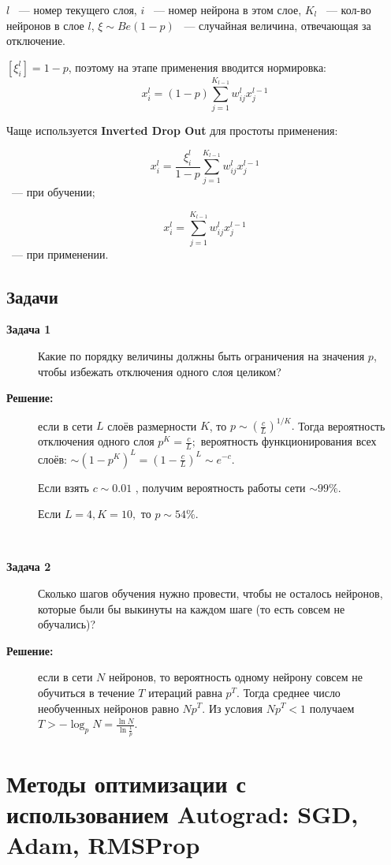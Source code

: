 $l$ ~--- номер текущего слоя, $i$ ~--- номер нейрона в этом слое, $K_l$ ~--- кол-во нейронов в слое $l$, $\xi \sim Be(1-p)$ ~--- случайная величина, отвечающая за отключение.

$\left[\xi_i^l\right] = 1-p$, поэтому на этапе применения вводится нормировка:
$$x_i^l = (1-p) \sum_{j=1}^{K_{l-1}} w_{ij}^l x_j^{l-1} $$

Чаще используется \textbf{Inverted Drop Out} для простоты применения:

$$x_i^l = \frac{\xi_i^l}{1-p} \sum_{j=1}^{K_{l-1}} w_{ij}^l x_j^{l-1} $$
~--- при обучении;

$$x_i^l = \sum_{j=1}^{K_{l-1}} w_{ij}^l x_j^{l-1} $$
~--- при применении.

\subsection{Задачи}
\begin{description}
\item[\textbf{Задача 1}] 
    Какие по порядку величины должны быть ограничения на значения $p$, чтобы избежать отключения одного слоя целиком?
\item[\textbf{Решение:}] если в сети $L$ слоёв размерности $K$, то $p \sim (\frac{c}{L})^{1/K}. $
    Тогда вероятность отключения одного слоя $p^K = \frac{c}{L}; $ вероятность функционирования всех слоёв: $\sim (1-p^K)^L = (1-\frac{c}{L})^L \sim e^{-c}$.
    
    Если взять $c\sim 0.01$ , получим вероятность работы сети $\sim 99\%$.
    
    Если $L=4, K=10,$ то $p \sim 54\%$.

\

\item[\textbf{Задача 2}] 
    Сколько шагов обучения нужно провести, чтобы не осталось нейронов, которые были бы выкинуты на каждом шаге (то есть совсем не обучались)?

\item[\textbf{Решение:}] если в сети $N$ нейронов, то вероятность одному нейрону совсем не обучиться в течение $T$ итераций равна $p^T$. Тогда среднее число необученных нейронов равно $Np^T$. Из условия $Np^T<1$ получаем $T>-\log_{p}N = \frac{\ln N}{\ln \frac{1}{p}}$.
\end{description}




\section{Методы оптимизации с использованием Autograd: SGD, Adam, RMSProp}

